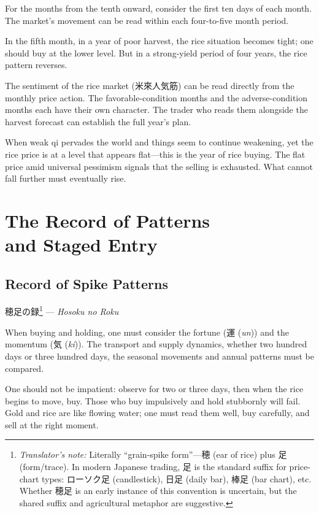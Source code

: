 \documentclass[10pt, openany]{book}
\newcommand{\jp}[1]{{\japanesefont #1}}
\newcommand{\tn}[1]{\footnote{\textit{Translator's note:} #1}}
\newcommand{\jt}[2]{\jp{#1} (\textit{#2})}
\begin{document}
For the months from the tenth onward, consider the first ten days of each
month. The market's movement can be read within each four-to-five month
period.

In the fifth month, in a year of poor harvest, the rice situation becomes
tight; one should buy at the lower level. But in a strong-yield period of
four years, the rice pattern reverses.

The sentiment of the rice market (\jp{米來人気筋}) can be read directly from
the monthly price action. The favorable-condition months and the
adverse-condition months each have their own character. The trader who reads
them alongside the harvest forecast can establish the full year's plan.

When weak qi pervades the world and things seem to continue weakening, yet
the rice price is at a level that appears flat---this is the year of rice
buying. The flat price amid universal pessimism signals that the selling is
exhausted. What cannot fall further must eventually rise.

\chapter{The Record of Patterns\\ and Staged Entry}

\section{Record of Spike Patterns}

\begin{center}
\jp{穂足の録}\tn{Literally ``grain-spike form''---\jp{穂}
(ear of rice) plus \jp{足} (form/trace). In modern Japanese trading,
\jp{足} is the standard suffix for price-chart types:
\jp{ローソク足} (candlestick), \jp{日足} (daily bar), \jp{棒足}
(bar chart), etc. Whether \jp{穂足} is an early instance of this
convention is uncertain, but the shared suffix and agricultural
metaphor are suggestive.} --- \textit{Hosoku no Roku}
\end{center}

When buying and holding, one must consider the fortune (\jt{運}{un}) and the
momentum (\jt{気}{ki}). The transport and supply dynamics, whether two
hundred days or three hundred days, the seasonal movements and annual
patterns must be compared.

One should not be impatient: observe for two or three days, then when the
rice begins to move, buy. Those who buy impulsively and hold stubbornly will
fail. Gold and rice are like flowing water; one must read them well, buy
carefully, and sell at the right moment.
\end{document}
